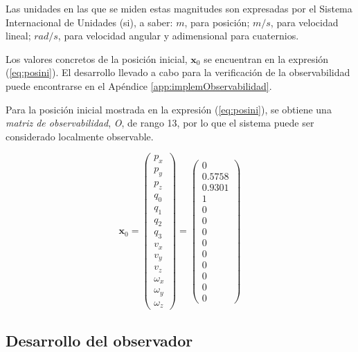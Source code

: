 Las unidades en las que se miden estas magnitudes son expresadas por el Sistema Internacional de Unidades (\acrshort{si}), a saber: $m$, para posición; $m/s$, para velocidad lineal; $rad/s$, para velocidad angular y adimensional para cuaternios. \par 

Los valores concretos de la posición inicial, $\boldsymbol{x}_0$ se encuentran en la expresión (\ref{eq:posini}). El desarrollo llevado a cabo para la verificación de la observabilidad puede encontrarse en el Apéndice \ref{app:implemObservabilidad}. \par 

Para la posición inicial mostrada en la expresión (\ref{eq:posini}), se obtiene una \emph{matriz de observabilidad}, \emph{O}, de rango 13, por lo que el sistema puede ser considerado localmente observable.

\begin{equation}
	\boldsymbol{x}_0 = 
	\begin{pmatrix}
		p_x\\p_y\\p_z \\ q_0\\q_1\\q_2\\q_3 \\ v_x\\v_y\\v_z \\ \omega_x \\ \omega_y \\ \omega_z
	\end{pmatrix} =
	\begin{pmatrix}
		0\\0.5758\\0.9301 \\ 1\\0\\0\\0 \\ 0\\0\\0 \\ 0\\0\\0
	\end{pmatrix}
\label{eq:posini}
\end{equation}

\subsection{Desarrollo del observador}


